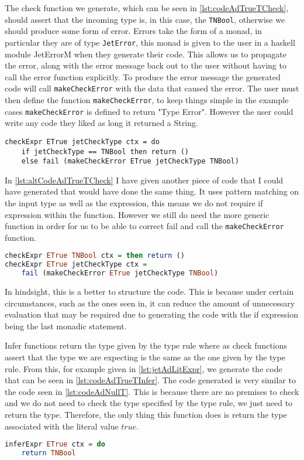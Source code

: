 The check function we generate, which can be seen in \autoref{lst:codeAdTrueTCheck}, should assert that the incoming type is, in this case, the \texttt{TNBool}, otherwise we should produce some form of error.
Errors take the form of a monad\cite{wadler1995monads}, in particular they are of type \texttt{JetError}, this monad is given to the user in a haskell module JetErrorM when they generate their code.
This allows us to propagate the error, along with the error message back out to the user without having to call the error function explicitly.
To produce the error message the generated code will call \texttt{makeCheckError} with the data that caused the error.
The user must then define the function \texttt{makeCheckError}, to keep things simple in the example cases \texttt{makeCheckError} is defined to return "Type Error".
However the user could write any code they liked as long it returned a String.

\begin{lstlisting}[caption = Code generated for checkExpr from AdTrueT, label=lst:codeAdTrueTCheck]
checkExpr ETrue jetCheckType ctx = do
    if jetCheckType == TNBool then return () 
    else fail (makeCheckError ETrue jetCheckType TNBool)
\end{lstlisting}

In \autoref{lst:altCodeAdTrueTCheck} I have given another piece of code that I could have generated that would have done the same thing.
It uses pattern matching on the input type as well as the expression, this means we do not require if expression within the function.
However we still do need the more generic function in order for us to be able to correct fail and call the \texttt{makeCheckError} function.

\begin{lstlisting}[caption = Alternate Code for checkExpr from AdTrueT, label=lst:altCodeAdTrueTCheck, language=Haskell]
checkExpr ETrue TNBool ctx = then return () 
checkExpr ETrue jetCheckType ctx = 
    fail (makeCheckError ETrue jetCheckType TNBool)
\end{lstlisting}

In hindsight, this is a better to structure the code.
This is because under certain circumstances, such as the ones seen in, it can reduce the amount of unnecessary evaluation that may be required due to generating the code with the if expression being the last monadic statement.

Infer functions return the type given by the type rule where as check functions assert that the type we are expecting is the same as the one given by the type rule.
From this, for example given in \autoref{lst:jetAdLitExpr}, we generate the code that can be seen in \autoref{lst:codeAdTrueTInfer}.
The code generated is very similar to the code seen in \autoref{lst:codeAdNullT}.
This is because there are no premises to check and we do not need to check the type specified by the type rule, we just need to return the type.
Therefore, the only thing this function does is return the type associated with the literal value $true$.

\begin{lstlisting}[caption = Code generated for inferExpr from AdTrueT, label=lst:codeAdTrueTInfer, language=Haskell]
inferExpr ETrue ctx = do
    return TNBool
\end{lstlisting}